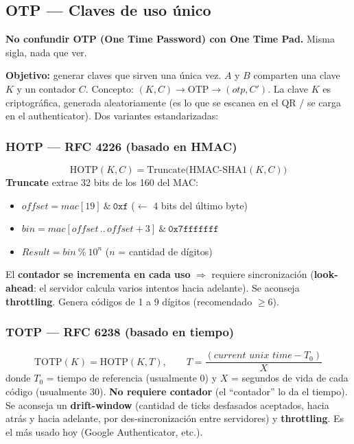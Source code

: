 \documentclass[../main.tex]{subfiles}
\begin{document}
\subsection{OTP --- Claves de uso único}

\begin{ojo}
\textbf{No confundir OTP (One Time Password) con One Time Pad.} Misma sigla, nada que ver.
\end{ojo}

\textbf{Objetivo:} generar claves que sirven una única vez. $A$ y $B$ comparten una clave $K$ y un contador $C$. Concepto: $(K,C)\rightarrow \text{OTP}\rightarrow(otp,C')$. La clave $K$ es criptográfica, generada aleatoriamente (es lo que se escanea en el QR / se carga en el authenticator). Dos variantes estandarizadas:

\subsubsection{HOTP --- RFC 4226 (basado en HMAC)}
$$\text{HOTP}(K,C)=\text{Truncate}\big(\text{HMAC-SHA1}(K,C)\big)$$
\textbf{Truncate} extrae 32 bits de los 160 del MAC:
\begin{itemize}[itemsep=1pt]
  \item $\textit{offset} = mac[19]\ \&\ \texttt{0xf}$ \quad ($\leftarrow$ 4 bits del último byte)
  \item $\textit{bin} = mac[\textit{offset}\,..\,\textit{offset}{+}3]\ \&\ \texttt{0x7fffffff}$
  \item $\textit{Result} = \textit{bin}\ \%\ 10^{n}$ \quad ($n$ = cantidad de dígitos)
\end{itemize}
El \textbf{contador se incrementa en cada uso} $\Rightarrow$ requiere sincronización (\textbf{look-ahead}: el servidor calcula varios intentos hacia adelante). Se aconseja \textbf{throttling}. Genera códigos de 1 a 9 dígitos (recomendado $\ge 6$).

\subsubsection{TOTP --- RFC 6238 (basado en tiempo)}
$$\text{TOTP}(K)=\text{HOTP}(K,T), \qquad T=\frac{(\textit{current unix time}-T_0)}{X}$$
donde $T_0$ = tiempo de referencia (usualmente $0$) y $X$ = segundos de vida de cada código (usualmente $30$). \textbf{No requiere contador} (el ``contador'' lo da el tiempo). Se aconseja un \textbf{drift-window} (cantidad de ticks desfasados aceptados, hacia atrás y hacia adelante, por des-sincronización entre servidores) y \textbf{throttling}. Es el más usado hoy (Google Authenticator, etc.).
\end{document}
